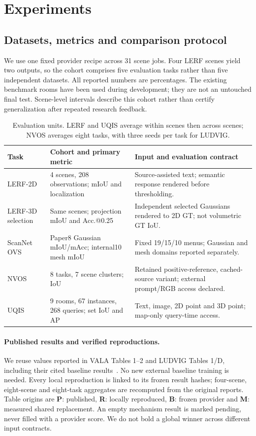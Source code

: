 \section{Experiments}
\label{sec:experiments}
\subsection{Datasets, metrics and comparison protocol}
We use one fixed provider recipe across 31 scene jobs. Four LERF scenes yield
two outputs, so the cohort comprises five evaluation tasks rather than five
independent datasets. All reported numbers are percentages. The existing
benchmark rooms have been used during development; they are not an untouched
final test. Scene-level intervals describe this cohort rather than certify
generalization after repeated research feedback.

\begin{table}[ht]
\centering\small
\begin{tabular}{lp{.25\linewidth}p{.43\linewidth}}
\toprule
Task & Cohort and primary metric & Input and evaluation contract \\
\midrule
LERF-2D & 4 scenes, 208 observations; mIoU and localization & Source-assisted text; semantic response rendered before thresholding. \\
LERF-3D selection & Same scenes; projection mIoU and Acc.@0.25 & Independent selected Gaussians rendered to 2D GT; not volumetric GT IoU. \\
ScanNet OVS & Paper8 Gaussian mIoU/mAcc; internal10 mesh mIoU & Fixed 19/15/10 menus; Gaussian and mesh domains reported separately. \\
NVOS & 8 tasks, 7 scene clusters; IoU & Retained positive-reference, cached-source variant; external prompt/RGB access declared. \\
UQIS & 9 rooms, 67 instances, 268 queries; set IoU and AP & Text, image, 2D point and 3D point; map-only query-time access. \\
\bottomrule
\end{tabular}
\caption{Evaluation units. LERF and UQIS average within scenes then across
scenes; NVOS averages eight tasks, with three seeds per task for LUDVIG.}
\label{tab:protocols}
\end{table}

\paragraph{Published results and verified reproductions.}
We reuse values reported in VALA Tables 1--2 and LUDVIG Tables 1/D, including
their cited baseline results~\cite{vala,ludvig}. No new external baseline training
is needed. Every local reproduction is linked to its frozen result hashes;
four-scene, eight-scene and eight-task aggregates are recomputed from the
original reports. Table origins are \textbf{P}: published, \textbf{R}: locally
reproduced, \textbf{B}: frozen provider and \textbf{M}: measured shared replacement.
An empty mechanism result is marked pending, never filled with a provider score.
We do not bold a global winner across different input contracts.

